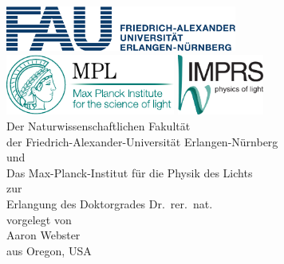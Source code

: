 \begin{titlepage}
\begin{center}
\hfill\\[2cm]
{\Huge {\bfseries \textsc {\distitle}} \par}
\vspace{3.0cm}
\includegraphics[height=1.5cm,keepaspectratio]{images/FAU_cmyk}\\
\vspace{1cm}
\includegraphics[height=2cm,keepaspectratio]{images/Logo_MPL_englisch_kompakt_cmyk_110915}
\hspace{1cm}
\includegraphics[height=2cm,keepaspectratio]{images/Logo_IMPRS_4c_042012}
\vspace{3cm}
\\
{\large
Der Naturwissenschaftlichen Fakultät\\
der Friedrich-Alexander-Universität Erlangen-Nürnberg\\
und\\
Das Max-Planck-Institut für die Physik des Lichts\\
\vspace{0.5cm}
zur\\
Erlangung des Doktorgrades Dr.\ rer.\ nat.\ \\
\vspace{0.5cm}
vorgelegt von\\
Aaron Webster\\
aus Oregon, USA
}
\end{center}
\tikzexternaldisable{}
\tikzexternalenable{}
\end{titlepage}
